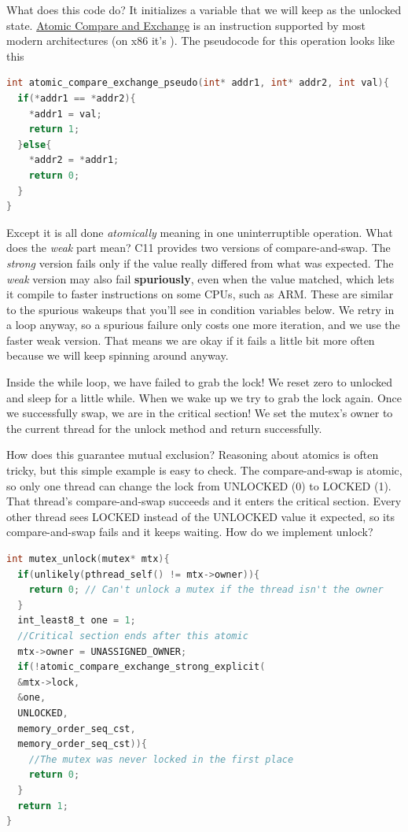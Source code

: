 What does this code do?
It initializes a variable that we will keep as the unlocked state.
\href{https://en.wikipedia.org/wiki/Compare-and-swap}{Atomic Compare and Exchange} is an instruction supported by most modern architectures (on x86 it's ).
The pseudocode for this operation looks like this

\begin{lstlisting}[language=C]
int atomic_compare_exchange_pseudo(int* addr1, int* addr2, int val){
  if(*addr1 == *addr2){
    *addr1 = val;
    return 1;
  }else{
    *addr2 = *addr1;
    return 0;
  }
}
\end{lstlisting}

Except it is all done \emph{atomically} meaning in one uninterruptible operation.
What does the \emph{weak} part mean?
C11 provides two versions of compare-and-swap.
The \emph{strong} version fails only if the value really differed from what was expected.
The \emph{weak} version may also fail \textbf{spuriously}, even when the value matched, which lets it compile to faster instructions on some CPUs, such as ARM.
These are similar to the spurious wakeups that you'll see in condition variables below.
We retry in a loop anyway, so a spurious failure only costs one more iteration, and we use the faster weak version.
That means we are okay if it fails a little bit more often because we will keep spinning around anyway.

Inside the while loop, we have failed to grab the lock!
We reset zero to unlocked and sleep for a little while.
When we wake up we try to grab the lock again.
Once we successfully swap, we are in the critical section!
We set the mutex's owner to the current thread for the unlock method and return successfully.

How does this guarantee mutual exclusion?
Reasoning about atomics is often tricky, but this simple example is easy to check.
The compare-and-swap is atomic, so only one thread can change the lock from UNLOCKED (0) to LOCKED (1).
That thread's compare-and-swap succeeds and it enters the critical section.
Every other thread sees LOCKED instead of the UNLOCKED value it expected, so its compare-and-swap fails and it keeps waiting.
How do we implement unlock?

\begin{lstlisting}[language=C]
int mutex_unlock(mutex* mtx){
  if(unlikely(pthread_self() != mtx->owner)){
    return 0; // Can't unlock a mutex if the thread isn't the owner
  }
  int_least8_t one = 1;
  //Critical section ends after this atomic
  mtx->owner = UNASSIGNED_OWNER;
  if(!atomic_compare_exchange_strong_explicit(
  &mtx->lock,
  &one,
  UNLOCKED,
  memory_order_seq_cst,
  memory_order_seq_cst)){
    //The mutex was never locked in the first place
    return 0;
  }
  return 1;
}
\end{lstlisting}

